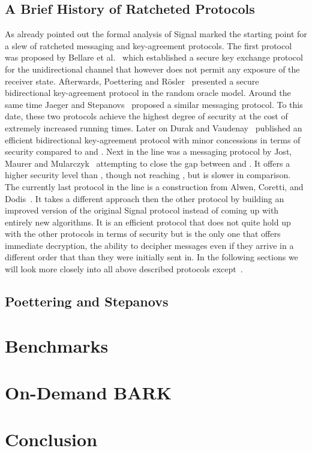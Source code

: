 \documentclass[11pt,a4paper,twoside,openright,bibliography=totoc]{scrbook}
\begin{document}
\section{A Brief History of Ratcheted Protocols}
\label{sec:brief-hist-ratch}

As already pointed out the formal analysis of Signal marked the
starting point for a slew of ratcheted messaging and key-agreement
protocols. The first protocol was proposed by Bellare et
al.~\cite{bellare2017ratcheted} which established a secure key
exchange protocol for the unidirectional channel that however does not
permit any exposure of the receiver state. Afterwards, Poettering and
Rösler~\cite{poettering2018towards} presented a secure bidirectional
key-agreement protocol in the random oracle model. Around the same
time Jaeger and Stepanovs~\cite{jaeger2018optimal} proposed a similar
messaging protocol. To this date, these two protocols achieve the
highest degree of security at the cost of extremely increased running
times.  Later on Durak and Vaudenay~\cite{durak2018bidirectional}
published an efficient bidirectional key-agreement protocol with minor
concessions in terms of security compared to
\cite{poettering2018towards} and \cite{jaeger2018optimal}.  Next in
the line was a messaging protocol by Jost, Maurer and
Mularczyk~\cite{jostefficient} attempting to close the gap between
\cite{durak2018bidirectional} and
\cite{poettering2018towards,jaeger2018optimal}. It offers a higher
security level than \cite{durak2018bidirectional}, though not reaching
\cite{poettering2018towards,jaeger2018optimal}, but is slower in
comparison. The currently last protocol in the line is a construction
from Alwen, Coretti, and Dodis~\cite{alwen2018double}. It takes
a different approach then the other protocol by building an
improved version of the original Signal protocol instead of
coming up with entirely new algorithms. It is an efficient protocol
that does not quite hold up with the other protocols in terms of
security but is the only one that offers immediate decryption,
the ability to decipher messages even if they arrive in
a different order that than they were initially sent in.
In the following sections we will look more closely into all
above described protocols except~\cite{bellare2017ratcheted}.

\section[Poettering and Stepanovs]
{Poettering and Stepanovs~\cite{jaeger2018optimal}}
\label{sec:poettering-stepanovs}


\chapter{Benchmarks}
\label{chap:benchmarks}

\chapter{On-Demand BARK}
\label{chap:bark}

\chapter{Conclusion}
\label{chap:conclusion}





\listoffigures
\end{document}
